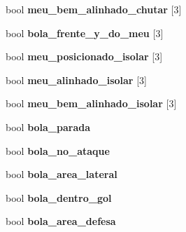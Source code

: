 \begin{DoxyCompactItemize}
\item 
bool {\bfseries meu\+\_\+bem\+\_\+alinhado\+\_\+chutar} \mbox{[}3\mbox{]}\hypertarget{classStrategy_a61fa3ac394ce7ae21396ac9183124c57}{}\label{classStrategy_a61fa3ac394ce7ae21396ac9183124c57}

\item 
bool {\bfseries bola\+\_\+frente\+\_\+y\+\_\+do\+\_\+meu} \mbox{[}3\mbox{]}\hypertarget{classStrategy_a143eadd8ced4ccee709ca03ebe272619}{}\label{classStrategy_a143eadd8ced4ccee709ca03ebe272619}

\item 
bool {\bfseries meu\+\_\+posicionado\+\_\+isolar} \mbox{[}3\mbox{]}\hypertarget{classStrategy_a4ad90e42ee59d0472058fa6b0c783c48}{}\label{classStrategy_a4ad90e42ee59d0472058fa6b0c783c48}

\item 
bool {\bfseries meu\+\_\+alinhado\+\_\+isolar} \mbox{[}3\mbox{]}\hypertarget{classStrategy_aa27d577ff50932b8c90925547c48cb7d}{}\label{classStrategy_aa27d577ff50932b8c90925547c48cb7d}

\item 
bool {\bfseries meu\+\_\+bem\+\_\+alinhado\+\_\+isolar} \mbox{[}3\mbox{]}\hypertarget{classStrategy_a7e82059c0f4ecbd72d70466094884946}{}\label{classStrategy_a7e82059c0f4ecbd72d70466094884946}

\item 
bool {\bfseries bola\+\_\+parada}\hypertarget{classStrategy_a4d44fd78427e65379516cae9f442d3f7}{}\label{classStrategy_a4d44fd78427e65379516cae9f442d3f7}

\item 
bool {\bfseries bola\+\_\+no\+\_\+ataque}\hypertarget{classStrategy_aec3de08b65d4e3baa9aa9d562b74288b}{}\label{classStrategy_aec3de08b65d4e3baa9aa9d562b74288b}

\item 
bool {\bfseries bola\+\_\+area\+\_\+lateral}\hypertarget{classStrategy_a97b90b7beaa926222cb54086bd8c949d}{}\label{classStrategy_a97b90b7beaa926222cb54086bd8c949d}

\item 
bool {\bfseries bola\+\_\+dentro\+\_\+gol}\hypertarget{classStrategy_a50a8cae5576e6ffa3d9d354b03ab6083}{}\label{classStrategy_a50a8cae5576e6ffa3d9d354b03ab6083}

\item 
bool {\bfseries bola\+\_\+area\+\_\+defesa}\hypertarget{classStrategy_a93a09eb3c852d97aee3816f4eedbd265}{}\label{classStrategy_a93a09eb3c852d97aee3816f4eedbd265}


\end{DoxyCompactItemize}
